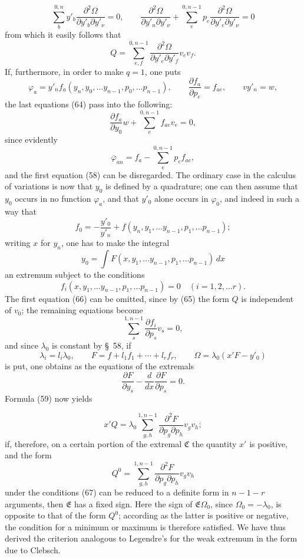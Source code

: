 \documentclass[11pt,a4paper,leqno]{article}
\begin{document}
\[
\sum_b^{0,n}y'_b
\frac{\partial^2\Omega}{\partial y'_b\partial y'_\nu}=0,\qquad
\frac{\partial^2\Omega}{\partial y'_n\partial y'_\nu}
+\sum_e^{0,n-1}p_e
\frac{\partial^2\Omega}{\partial y'_e\partial y'_\nu}=0
\]
from which it easily follows that
\begin{equation}\tag{65}
Q=\sum_{e,f}^{0,n-1}
\frac{\partial^2\Omega}{\partial y'_e\partial y'_f}v_ev_f.
\end{equation}
If, furthermore, in order to make $q=1$, one puts
\[
\varphi_a=y'_n f_a(y_n,y_0,\ldots y_{n-1},p_0,\ldots p_{n-1}),\qquad
\frac{\partial f_a}{\partial p_e}=f_{ae},\qquad vy'_n=w,
\]
the last equations (64) pass into the following:
\begin{equation}\tag{66}
\frac{\partial f_a}{\partial y_0}w
+\sum_e^{0,n-1}f_{ae}v_e=0,
\end{equation}
since evidently
\[
\overline{\varphi}_{an}=f_a-\sum_e^{0,n-1}p_e f_{ae},
\]
and the first equation (58) can be disregarded. The ordinary case in
the calculus of variations is now that $y_0$ is defined by a
quadrature; one can then assume that $y_0$ occurs in no function
$\varphi_a$, and that $y'_0$ alone occurs in $\varphi_0$, and indeed in
such a way that
\[
f_0=-\frac{y'_0}{y'_n}
+f(y_n,y_1,\ldots y_{n-1},p_1,\ldots p_{n-1});
\]
writing $x$ for $y_n$, one has to make the integral
\[
y_0=\int F(x,y_1,\ldots y_{n-1},p_1,\ldots p_{n-1})\,dx
\]
an extremum subject to the conditions
\[
f_i(x,y_1,\ldots y_{n-1},p_1,\ldots p_{n-1})=0
\quad(i=1,2,\ldots r).
\]
The first equation (66) can be omitted, since by (65) the form $Q$ is
independent of $v_0$; the remaining equations become
\begin{equation}\tag{67}
\sum_s^{1,n-1}\frac{\partial f_i}{\partial p_s}v_s=0,
\end{equation}
and since $\lambda_0$ is constant by \S~58, if
\[
\lambda_i=l_i\lambda_0,\qquad
F=f+l_1f_1+\cdots+l_rf_r,\qquad
\Omega=\lambda_0(x'F-y'_0)
\]
is put, one obtains as the equations of the extremals
\[
\frac{\partial F}{\partial y_s}
-\frac{d}{dx}\frac{\partial F}{\partial p_s}=0.
\]
Formula (59) now yields

\[
x'Q=\lambda_0\sum_{g,h}^{1,n-1}
\frac{\partial^2F}{\partial p_g\partial p_h}v_gv_h;
\]
if, therefore, on a certain portion of the extremal $\mathfrak{C}$ the
quantity $x'$ is positive, and the form
\[
Q^0=\sum_{g,h}^{1,n-1}
\frac{\partial^2F}{\partial p_g\partial p_h}v_gv_h
\]
under the conditions (67) can be reduced to a definite form in
$n-1-r$ arguments, then $\mathfrak{E}$ has a fixed sign. Here the sign
of $\mathfrak{E}\Omega_0$, since $\Omega_0=-\lambda_0$, is opposite to
that of the form $Q^0$; according as the latter is positive or
negative, the condition for a minimum or maximum is therefore
satisfied. We have thus derived the criterion analogous to Legendre's
for the weak extremum in the form due to Clebsch.
\end{document}
